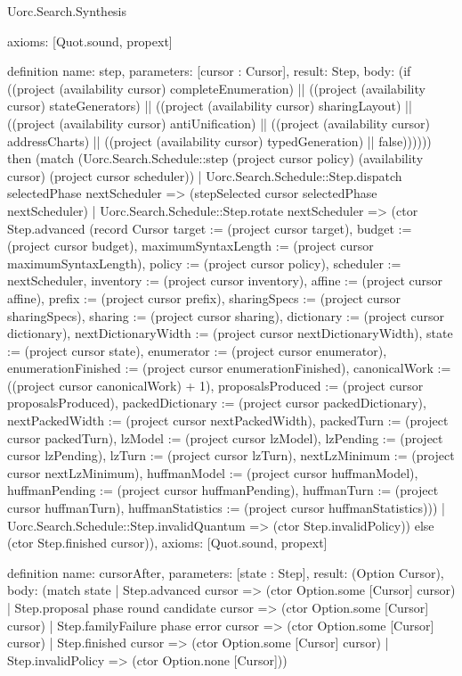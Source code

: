 \begin{lexlean}{Uorc.Search.Synthesis}
\begin{semanticmodule}
{  axioms: [Quot.sound, propext]
}

definition{
  name: step,
  parameters: [cursor : Cursor],
  result: Step,
  body: (if ((project (availability cursor) completeEnumeration) || ((project (availability cursor) stateGenerators) || ((project (availability cursor) sharingLayout) || ((project (availability cursor) antiUnification) || ((project (availability cursor) addressCharts) || ((project (availability cursor) typedGeneration) || false)))))) then (match (Uorc.Search.Schedule::step (project cursor policy) (availability cursor) (project cursor scheduler))
    | Uorc.Search.Schedule::Step.dispatch selectedPhase nextScheduler => (stepSelected cursor selectedPhase nextScheduler)
    | Uorc.Search.Schedule::Step.rotate nextScheduler => (ctor Step.advanced (record Cursor {target := (project cursor target), budget := (project cursor budget), maximumSyntaxLength := (project cursor maximumSyntaxLength), policy := (project cursor policy), scheduler := nextScheduler, inventory := (project cursor inventory), affine := (project cursor affine), prefix := (project cursor prefix), sharingSpecs := (project cursor sharingSpecs), sharing := (project cursor sharing), dictionary := (project cursor dictionary), nextDictionaryWidth := (project cursor nextDictionaryWidth), state := (project cursor state), enumerator := (project cursor enumerator), enumerationFinished := (project cursor enumerationFinished), canonicalWork := ((project cursor canonicalWork) + 1), proposalsProduced := (project cursor proposalsProduced), packedDictionary := (project cursor packedDictionary), nextPackedWidth := (project cursor nextPackedWidth), packedTurn := (project cursor packedTurn), lzModel := (project cursor lzModel), lzPending := (project cursor lzPending), lzTurn := (project cursor lzTurn), nextLzMinimum := (project cursor nextLzMinimum), huffmanModel := (project cursor huffmanModel), huffmanPending := (project cursor huffmanPending), huffmanTurn := (project cursor huffmanTurn), huffmanStatistics := (project cursor huffmanStatistics)}))
    | Uorc.Search.Schedule::Step.invalidQuantum => (ctor Step.invalidPolicy)) else (ctor Step.finished cursor)),
  axioms: [Quot.sound, propext]
}

definition{
  name: cursorAfter,
  parameters: [state : Step],
  result: (Option Cursor),
  body: (match state
    | Step.advanced cursor => (ctor Option.some [Cursor] cursor)
    | Step.proposal phase round candidate cursor => (ctor Option.some [Cursor] cursor)
    | Step.familyFailure phase error cursor => (ctor Option.some [Cursor] cursor)
    | Step.finished cursor => (ctor Option.some [Cursor] cursor)
    | Step.invalidPolicy => (ctor Option.none [Cursor]))
}


\end{semanticmodule}
\end{lexlean}
